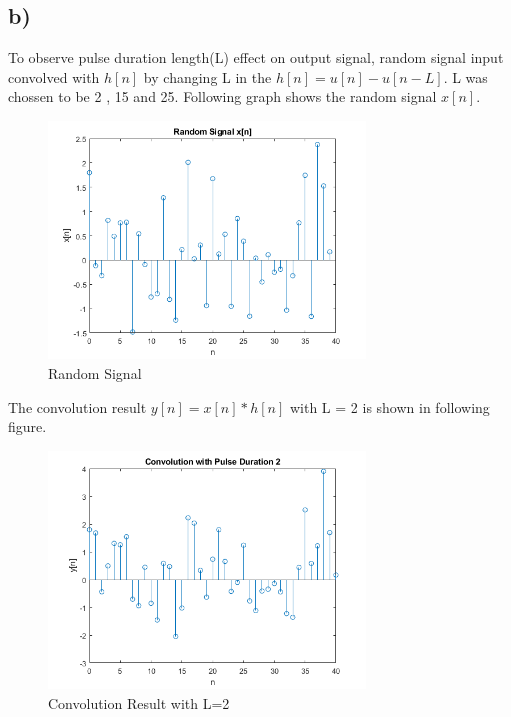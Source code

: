 \documentclass[letterpaper,12pt]{article}
\begin{document}
\subsection{b)}
To observe pulse duration length(L) effect on output signal, random signal input convolved with \(h[n]\) by changing L in the \(h[n] = u[n] - u[n-L]\). L was chossen to be 2 , 15 and 25.
Following graph shows the random signal \(x[n]\).
\begin{figure}[H]
    \centering
    \includegraphics[width = 0.75\textwidth]{b_signal.png}
    \caption{Random Signal}
    \end{figure} 


The convolution result \(y[n] = x[n] * h[n]\) with L = 2 is shown in following figure.
\begin{figure}[H]
    \centering
    \includegraphics[width = 0.75\textwidth]{b_duration2.png}
    \caption{Convolution Result with L=2}
    \end{figure} 
\end{document}
